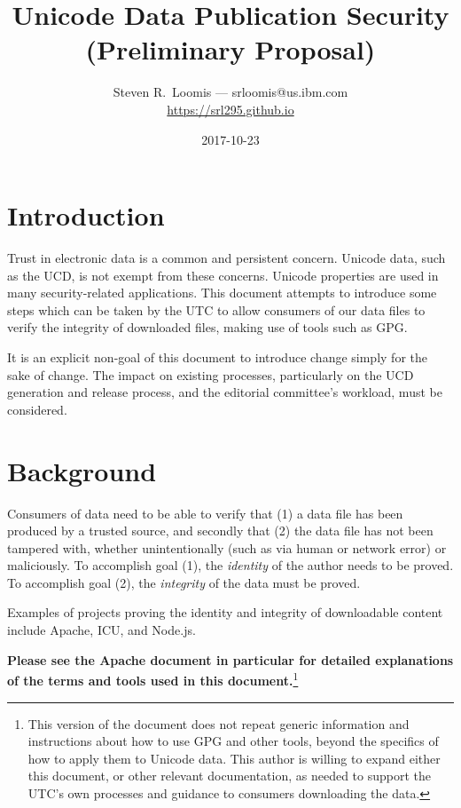 \documentclass[12pt]{article}
\title{Unicode Data Publication Security\\\normalsize \sf (Preliminary Proposal)}
\author{Steven R.~Loomis — srloomis@us.ibm.com\\\small\url{https://srl295.github.io}}
\date{2017-10-23}
\begin{document}
\maketitle

\section{Introduction}

Trust in electronic data is a common and persistent concern. Unicode data, such as the UCD, is not exempt from these concerns. Unicode properties are used in many security-related applications.\autocite{spotify2013} This document attempts to introduce some steps which can be taken by the UTC to allow consumers of our data files to verify the integrity of downloaded files, making use of tools such as GPG\autocite{gnupg}.

It is an explicit non-goal of this document to introduce change simply for the sake of change. The impact on existing processes, particularly on the UCD generation and release process, and the editorial committee's workload, must be considered.

\section{Background}

Consumers of data need to be able to verify that (1) a data file has been produced by a trusted source, and secondly that (2) the data file has not been tampered with, whether unintentionally (such as via human or network error) or maliciously.  To accomplish goal (1), the \emph{identity} of the author needs to be proved. To accomplish goal (2), the \emph{integrity} of the data must be proved.

Examples of projects proving the identity and integrity of downloadable content include Apache\autocite{apache-release-signing}, ICU\autocite{icuverify}, and Node.js\autocite{nodejs-release-binaries}.

\textbf{Please see the Apache\autocite{apache-release-signing} document in particular for detailed explanations of the terms and tools used in this document.}\footnote{This version of the document does not repeat generic information and instructions about how to use GPG and other tools, beyond the specifics of how to apply them to Unicode data.  This author is willing to expand either this document, or other relevant documentation, as needed to support the UTC's own processes and guidance to consumers downloading the data.}
\end{document}
